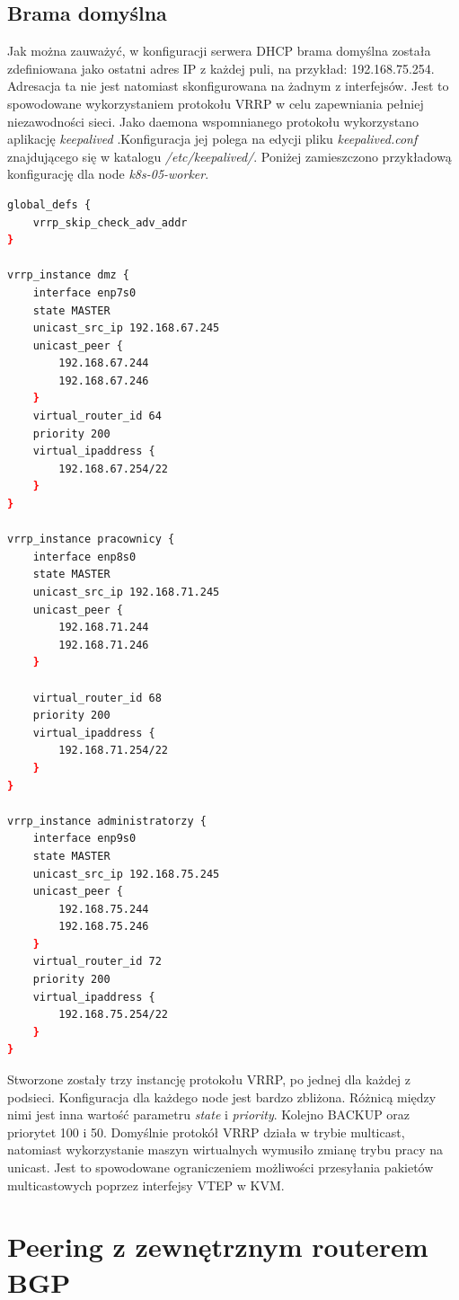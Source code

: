 \documentclass[pl,final,oneside]{mgr} %
\begin{document}
\subsection{Brama domyślna}
Jak można zauważyć, w konfiguracji serwera DHCP brama domyślna została zdefiniowana jako ostatni adres IP z każdej puli, na przykład: 192.168.75.254. Adresacja ta nie jest natomiast skonfigurowana na żadnym z interfejsów. Jest to spowodowane wykorzystaniem protokołu VRRP w celu zapewniania pełniej niezawodności sieci. Jako daemona wspomnianego protokołu wykorzystano aplikację \textit{keepalived} .Konfiguracja jej polega na edycji pliku \textit{keepalived.conf} znajdującego się w katalogu \textit{/etc/keepalived/}. Poniżej zamieszczono przykładową konfigurację dla node \textit{k8s-05-worker}.
\begin{lstlisting}[language=Bash]
global_defs {
	vrrp_skip_check_adv_addr
}

vrrp_instance dmz {
	interface enp7s0          
	state MASTER
	unicast_src_ip 192.168.67.245
	unicast_peer {
		192.168.67.244
		192.168.67.246
	}
	virtual_router_id 64     
	priority 200               
	virtual_ipaddress {
		192.168.67.254/22     
	}
}

vrrp_instance pracownicy {
	interface enp8s0         
	state MASTER   
	unicast_src_ip 192.168.71.245
	unicast_peer {
		192.168.71.244
		192.168.71.246
	}
	
	virtual_router_id 68  
	priority 200             
	virtual_ipaddress {
		192.168.71.254/22   
	}
}

vrrp_instance administratorzy {
	interface enp9s0
	state MASTER          
	unicast_src_ip 192.168.75.245
	unicast_peer {
		192.168.75.244
		192.168.75.246
	}
	virtual_router_id 72      
	priority 200               
	virtual_ipaddress {
		192.168.75.254/22        
	}
}
\end{lstlisting}
Stworzone zostały trzy instancję protokołu VRRP, po jednej dla każdej z podsieci. Konfiguracja dla każdego node jest bardzo zbliżona. Różnicą między nimi jest inna wartość parametru \textit{state} i \textit{priority}. Kolejno BACKUP oraz priorytet 100 i 50. Domyślnie protokół VRRP działa w trybie multicast, natomiast wykorzystanie maszyn wirtualnych wymusiło zmianę trybu pracy na unicast. Jest to spowodowane ograniczeniem możliwości przesyłania pakietów multicastowych poprzez interfejsy VTEP w KVM.


\section{Peering z zewnętrznym routerem BGP}
\end{document}
